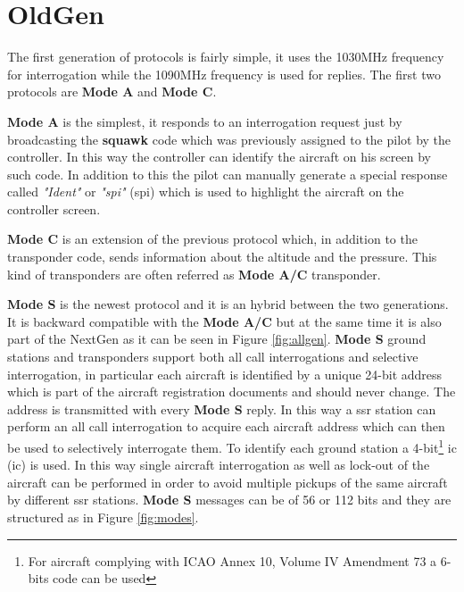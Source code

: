 \documentclass[../main.tex]{subfiles}
\begin{document}
\section{OldGen}

The first generation of protocols is fairly simple, it uses the 1030MHz frequency for interrogation while the 1090MHz frequency is used for replies.
The first two protocols are \textbf{Mode A} and \textbf{Mode C}.

\textbf{Mode A} is the simplest, it responds to an interrogation request just by broadcasting the \textbf{squawk} code which was previously assigned to the pilot by the controller. In this way the controller can identify the aircraft on his screen by such code. In addition to this the pilot can manually generate a special response called \textit{"Ident"} or \textit{"\acrshort{spi}"} (\acrlong{spi}) which is used to highlight the aircraft on the controller screen.

\textbf{Mode C} is an extension of the previous protocol which, in addition to the transponder code, sends information about the altitude and the pressure. This kind of transponders are often referred as \textbf{Mode A/C} transponder.

\textbf{Mode S} is the newest protocol and it is an hybrid between the two generations. It is backward compatible with the \textbf{Mode A/C} but at the same time it is also part of the NextGen as it can be seen in Figure \ref{fig:allgen}. \textbf{Mode S} ground stations and transponders support both all call interrogations and selective interrogation, in particular each aircraft is identified by a unique 24-bit address which is part of the aircraft registration documents and should never change. The address is transmitted with every \textbf{Mode S} reply. In this way a \acrshort{ssr} station can perform an all call interrogation to acquire each aircraft address which can then be used to selectively interrogate them. To identify each ground station a 4-bit\footnote{For aircraft complying with ICAO Annex 10, Volume IV Amendment 73 a 6-bits code can be used} \acrlong{ic} (\acrshort{ic}) is used. In this way single aircraft interrogation as well as lock-out of the aircraft can be performed in order to avoid multiple pickups of the same aircraft by different \acrshort{ssr} stations. \textbf{Mode S} messages can be of 56 or 112 bits and they are structured as in Figure \ref{fig:modes}.
\end{document}
